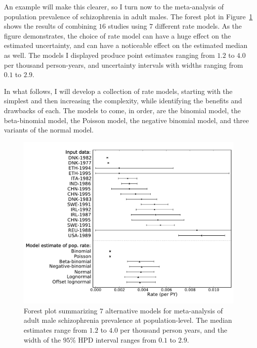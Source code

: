 An example will make this clearer, so I turn now to the meta-analysis
of population prevalence of schizophrenia in adult males.  The forest
plot in Figure~\ref{rate-model-schiz-forest} shows the
results of combining $16$ studies using $7$ different rate models.  As
the figure demonstrates, the choice of rate model can have a huge
effect on the estimated uncertainty, and can have a noticeable effect
on the estimated median as well. The models I displayed produce point
estimates ranging from $1.2$ to $4.0$ per thousand person-years, and
uncertainty intervals with widths ranging from $0.1$ to $2.9$.

In what follows, I will develop a collection of rate models, starting
with the simplest and then increasing the complexity, while
identifying the benefits and drawbacks of each.  The models to come,
in order, are the binomial model, the beta-binomial model, the Poisson
model, the negative binomial model, and three variants of the normal
model.

\begin{figure}[h]
\begin{center}
\includegraphics[width=\textwidth]{schiz_forest.pdf}

\end{center}
\caption{Forest plot summarizing $7$ alternative models for
  meta-analysis of adult male schizophrenia prevalence at
  population-level.  The median estimates range from
  $1.2$ to
  $4.0$ per thousand person years, and the width of the
  $95\%$ HPD interval ranges from
  $0.1$ to
  $2.9$.}
\label{rate-model-schiz-forest}
\end{figure}

